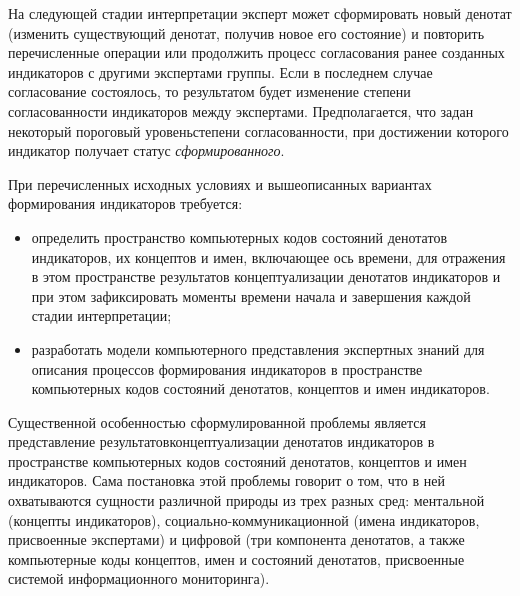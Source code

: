 \begin{multicols}{2}
   На следующей стадии интерпретации эксперт может сформировать новый денотат 
(изменить существующий денотат, получив новое его состояние)\linebreak
и повторить перечисленные 
операции или продолжить процесс согласования ранее созданных индикаторов с другими 
экспертами группы. Если в\linebreak
последнем случае согласование состоялось, то результатом будет 
изменение степени согласован\-ности индикаторов между экспертами. Предполагается, что 
задан некоторый пороговый уровень\linebreak степени согласованности, при достижении которого 
индикатор получает статус \textit{сформированного}.
   
   При перечисленных исходных условиях и вышеописанных вариантах формирования 
индикаторов требуется:
   \begin{itemize}
\item определить пространство компьютерных кодов состояний денотатов индикаторов, 
их концептов и имен, включающее ось времени, для отражения в этом пространстве 
результатов концептуализации денотатов индикаторов и при этом зафиксировать моменты 
времени начала и завершения каждой стадии интерпретации;
\item разработать модели компьютерного пред\-став\-ле\-ния экспертных знаний для описания 
процес\-сов формирования индикаторов в пространстве компьютерных кодов состояний 
денотатов, концептов и имен индикаторов.
\end{itemize}

   Существенной особенностью сформулированной проблемы является 
представление результатов\linebreak концептуализации денотатов индикаторов в пространстве 
компьютерных кодов состояний денотатов, концептов и имен индикаторов. Сама постановка 
этой проблемы говорит о том, что в ней\linebreak
охватываются сущности различной природы из трех 
разных сред: ментальной (концепты индикаторов), со\-ци\-аль\-но-коммуникационной (имена 
индикаторов, присвоенные экспертами) и цифровой (три компонента денотатов, а также 
компьютерные коды концептов, имен и состояний денотатов, присвоенные системой 
информационного мо\-ни\-то\-ринга).

\begin{figure*}[b] %
\vspace*{9pt}
\begin{center}
\mbox{%
\epsfxsize=123.91mm
}
\end{center}
\vspace*{-9pt}
\end{figure*}
   

\end{multicols}
